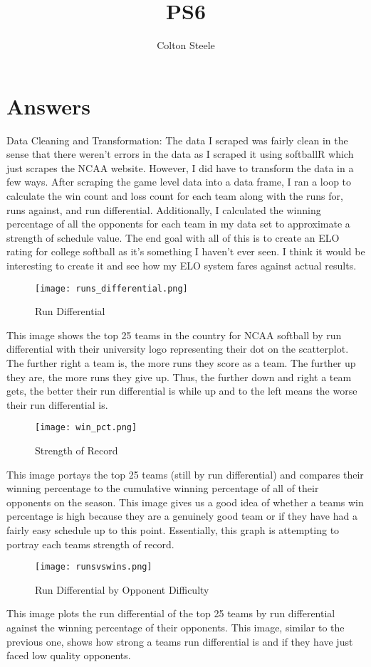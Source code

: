 \documentclass{article}
\title{PS6}
\author{Colton Steele}
\begin{document}
\maketitle


\section{Answers}

Data Cleaning and Transformation: The data I scraped was fairly clean in the sense that there weren't errors in the data as I scraped it using softballR which just scrapes the NCAA website. However, I did have to transform the data in a few ways. After scraping the game level data into a data frame, I ran a loop to calculate the win count and loss count for each team along with the runs for, runs against, and run differential. Additionally, I calculated the winning percentage of all the opponents for each team in my data set to approximate a strength of schedule value. The end goal with all of this is to create an ELO rating for college softball as it's something I haven't ever seen. I think it would be interesting to create it and see how my ELO system fares against actual results. 



\begin{figure}[H]
  \centering
  \texttt{[image: runs\_differential.png]}
  \caption{Run Differential}
  \label{fig:image-label}
\end{figure}

This image shows the top 25 teams in the country for NCAA softball by run differential with their university logo representing their dot on the scatterplot. The further right a team is, the more runs they score as a team. The further up they are, the more runs they give up. Thus, the further down and right a team gets, the better their run differential is while up and to the left means the worse their run differential is. 

\begin{figure}[H]
  \centering
  \texttt{[image: win\_pct.png]}
  \caption{Strength of Record}
  \label{fig:image-label}
\end{figure}

This image portays the top 25 teams (still by run differential) and compares their winning percentage to the cumulative winning percentage of all of their opponents on the season. This image gives us a good idea of whether a teams win percentage is high because they are a genuinely good team or if they have had a fairly easy schedule up to this point. Essentially, this graph is attempting to portray each teams strength of record.

\begin{figure}[H]
  \centering
  \texttt{[image: runsvswins.png]}
  \caption{Run Differential by Opponent Difficulty}
  \label{fig:image-label}
\end{figure}

This image plots the run differential of the top 25 teams by run differential against the winning percentage of their opponents. This image, similar to the previous one, shows how strong a teams run differential is and if they have just faced low quality opponents.
\end{document}
